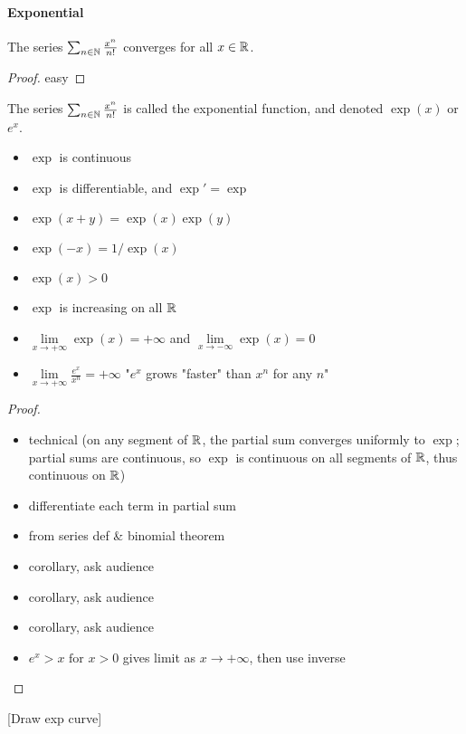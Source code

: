 \paragraph{Exponential}
\begin{proposition}
	The series $\sum_{n \in \mathbb{N}} \frac{x^n}{n!}$ converges for all $x \in \mathbb{R}$.
\end{proposition}
\begin{proof}
	easy
\end{proof}
\begin{definition}
	The series $\sum_{n \in \mathbb{N}} \frac{x^n}{n!}$ is called the exponential function, and denoted $\exp (x)$ or $e^x$.
\end{definition}
\begin{property}
	\begin{itemize}
		\item $\exp$ is continuous
		\item $\exp$ is differentiable, and $\exp' = \exp$
		\item $\exp(x+y) = \exp(x) \exp(y)$
		\item $\exp(-x) = 1/\exp(x)$
		\item $\exp(x) > 0$
		\item $\exp$ is increasing on all $\mathbb{R}$
		\item $\lim\limits_{x \to +\infty} \exp(x) = +\infty$ and $\lim\limits_{x \to -\infty} \exp(x) = 0$
		\item $\lim\limits_{x \to + \infty} \frac{e^x}{x^n} = +\infty$ "$e^x$ grows "faster" than $x^n$ for any $n$"
	\end{itemize}
\end{property}
\begin{proof}
	\begin{itemize}
		\item technical (on any segment of $\mathbb{R}$, the partial sum converges uniformly to $\exp$; partial sums are continuous, so $\exp$ is continuous on all segments of $\mathbb{R}$, thus continuous on $\mathbb{R}$)
		\item differentiate each term in partial sum
		\item from series def \& binomial theorem
		\item corollary, ask audience
		\item corollary, ask audience
		\item corollary, ask audience
		\item $e^x>x \text{ for } x>0$ gives limit as $x \to +\infty$, then use inverse
	\end{itemize}
\end{proof}
[Draw exp curve]

